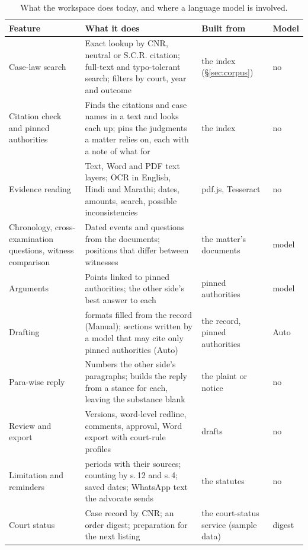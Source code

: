 \begin{table}[t]
\caption{What the workspace does today, and where a language model is involved.}
\label{tab:features}
\centering
\footnotesize
\setlength{\tabcolsep}{4pt}
\renewcommand{\arraystretch}{1.08}
\begin{tabular}{@{}>{\raggedright\arraybackslash}p{1.35in}>{\raggedright\arraybackslash}p{3.9in}>{\raggedright\arraybackslash}p{1.35in}>{\raggedright\arraybackslash}p{0.45in}@{}}
\toprule
Feature & What it does & Built from & Model \\
\midrule
Case-law search & Exact lookup by CNR, neutral or S.C.R. citation; full-text and typo-tolerant search; filters by court, year and outcome & the index (\S\ref{sec:corpus}) & no \\
Citation check and pinned authorities & Finds the citations and case names in a text and looks each up; pins the judgments a matter relies on, each with a note of what for & the index & no \\
Evidence reading & Text, Word and PDF text layers; OCR in English, Hindi and Marathi; dates, amounts, search, possible inconsistencies & pdf.js, Tesseract & no \\
Chronology, cross-examination questions, witness comparison & Dated events and questions from the documents; positions that differ between witnesses & the matter's documents & model \\
Arguments & Points linked to pinned authorities; the other side's best answer to each & pinned authorities & model \\
Drafting & \CaseFormats{} formats filled from the record (Manual); sections written by a model that may cite only pinned authorities (Auto) & the record, pinned authorities & Auto \\
Para-wise reply & Numbers the other side's paragraphs; builds the reply from a stance for each, leaving the substance blank & the plaint or notice & no \\
Review and export & Versions, word-level redline, comments, approval, Word export with court-rule profiles & drafts & no \\
Limitation and reminders & \CasePeriods{} periods with their sources; counting by s.\,12 and s.\,4; saved dates; WhatsApp text the advocate sends & the statutes & no \\
Court status & Case record by CNR; an order digest; preparation for the next listing & the court-status service (sample data) & digest \\
\bottomrule
\end{tabular}
\end{table}

